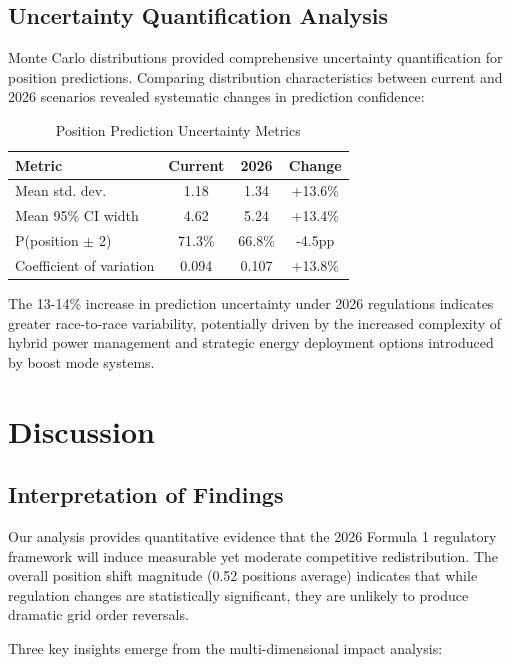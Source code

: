 \documentclass[conference]{IEEEtran}
\begin{document}
\subsection{Uncertainty Quantification Analysis}

Monte Carlo distributions provided comprehensive uncertainty quantification for position predictions. Comparing distribution characteristics between current and 2026 scenarios revealed systematic changes in prediction confidence:

\begin{table}[h]
\centering
\caption{Position Prediction Uncertainty Metrics}
\begin{tabular}{lccc}
\toprule
\textbf{Metric} & \textbf{Current} & \textbf{2026} & \textbf{Change} \\
\midrule
Mean std. dev. & 1.18 & 1.34 & +13.6\% \\
Mean 95\% CI width & 4.62 & 5.24 & +13.4\% \\
P(position $\pm$ 2) & 71.3\% & 66.8\% & -4.5pp \\
Coefficient of variation & 0.094 & 0.107 & +13.8\% \\
\bottomrule
\end{tabular}
\label{tab:uncertainty}
\end{table}

The 13-14\% increase in prediction uncertainty under 2026 regulations indicates greater race-to-race variability, potentially driven by the increased complexity of hybrid power management and strategic energy deployment options introduced by boost mode systems.

\section{Discussion}

\subsection{Interpretation of Findings}

Our analysis provides quantitative evidence that the 2026 Formula 1 regulatory framework will induce measurable yet moderate competitive redistribution. The overall position shift magnitude (0.52 positions average) indicates that while regulation changes are statistically significant, they are unlikely to produce dramatic grid order reversals.

Three key insights emerge from the multi-dimensional impact analysis:
\end{document}
